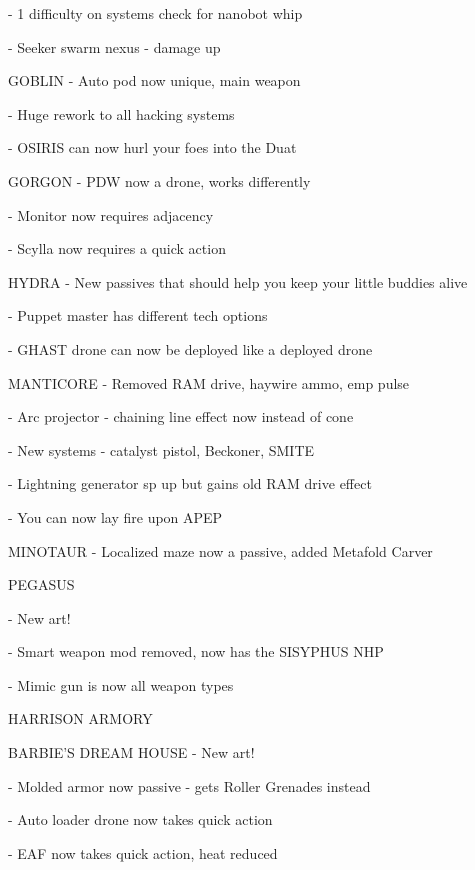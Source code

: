     -    1 difficulty on systems check for nanobot whip
 

    -    Seeker swarm nexus - damage up
 

GOBLIN  
    -    Auto pod now unique, main weapon
 

    -    Huge rework to all hacking systems
 
    -    OSIRIS can now hurl your foes into the Duat
 

GORGON  
    -    PDW now a drone, works differently
 
    -    Monitor now requires adjacency
 

    -    Scylla now requires a quick action
 
HYDRA   
    -    New passives that should help you keep your little buddies alive
 

                                                                                                                    


    -    Puppet master has different tech options
 
    -    GHAST drone can now be deployed like a deployed drone
 

MANTICORE  
    -    Removed RAM drive, haywire ammo, emp pulse
 

    -    Arc projector - chaining line effect now instead of cone
 
    -    New systems - catalyst pistol, Beckoner, SMITE
 
    -    Lightning generator sp up but gains old RAM drive effect
 

    -    You can now lay fire upon APEP
 
MINOTAUR  
    -    Localized maze now a passive, added Metafold Carver
 

PEGASUS 
 
    -    New art!
 
    -    Smart weapon mod removed, now has the SISYPHUS NHP
 

    -    Mimic gun is now all weapon types
 

                                              HARRISON ARMORY  

BARBIE’S DREAM HOUSE  
    -    New art!
 

    -    Molded armor now passive - gets Roller Grenades instead
 
    -    Auto loader drone now takes quick action
 
    -    EAF now takes quick action, heat reduced
 

